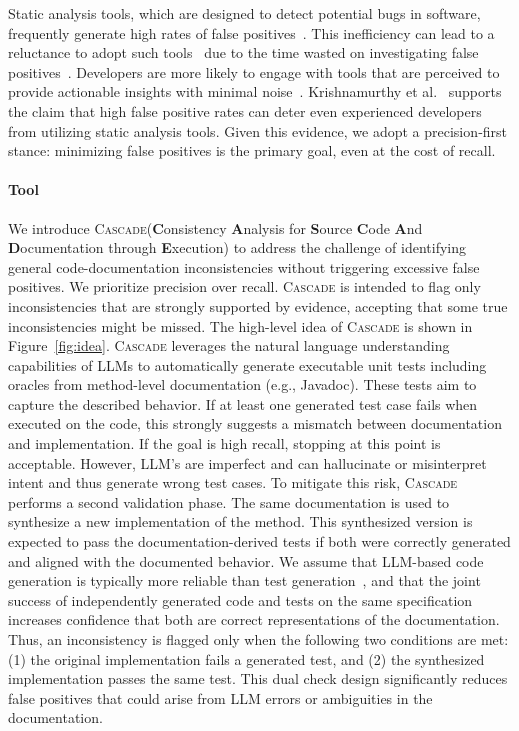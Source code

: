 \documentclass[acmsmall, screen]{acmart}
\newcommand{\tool}{\textsc{Cascade}\xspace}
\newcommand{\circled}[1]{\tikz[baseline=(char.base)]{\node[shape=circle,draw,inner sep=1pt] (char) {#1};}}
\begin{document}
Static analysis tools, which are designed to detect potential bugs in software, frequently generate high rates of false positives~\cite{shen2011efindbugs}. This inefficiency can lead to a reluctance to adopt such tools~\cite{croft2021empirical} due to the time wasted on investigating false positives~\cite{kharkar2022learning}. Developers are more likely to engage with tools that are perceived to provide actionable insights with minimal noise~\cite{tomasdottir2018adoption}. Krishnamurthy et al.~\cite{krishnamurthy2019scientific} supports the claim that high false positive rates can deter even experienced developers from utilizing static analysis tools. Given this evidence, we adopt a precision‑first stance: minimizing false positives is the primary goal, even at the cost of recall.

\paragraph{Tool} We introduce \tool (\textbf{C}onsistency \textbf{A}nalysis for \textbf{S}ource \textbf{C}ode \textbf{A}nd \textbf{D}ocumentation through \textbf{E}xecution) to address the challenge of identifying general code-documentation inconsistencies without triggering excessive false positives. 
We prioritize precision over recall. \tool is intended to flag only inconsistencies that are strongly supported by evidence, accepting that some true inconsistencies might be missed.
The high-level idea of \tool is shown in Figure~\ref{fig:idea}.
\circled{A}
\tool leverages the natural language understanding capabilities of LLMs to automatically generate executable unit tests including oracles from method-level documentation (e.g., Javadoc). These tests aim to capture the described behavior.  
\circled{B} 
If at least one generated test case fails when executed on the code, this strongly suggests a mismatch between documentation and implementation. If the goal is high recall, stopping at this point is acceptable. However, LLM's are imperfect and can hallucinate or misinterpret intent and thus generate wrong test cases. To mitigate this risk, \tool performs a second validation phase.
\circled{C}
The same documentation is used to synthesize a new implementation of the method. 
This synthesized version is expected to pass the documentation-derived tests if both were correctly generated and aligned with the documented behavior.
\circled{D}
We assume that LLM-based code generation is typically more reliable than test generation~\cite{ni2023lever, chen2022codet}, and that the joint success of independently generated code and tests on the same specification increases confidence that both are correct representations of the documentation.
\circled{E}
Thus, an inconsistency is flagged only when the following two conditions are met: (1) the original implementation fails a generated test, and (2) the synthesized implementation passes the same test. This dual check design significantly reduces false positives that could arise from LLM errors or ambiguities in the documentation.
\end{document}
